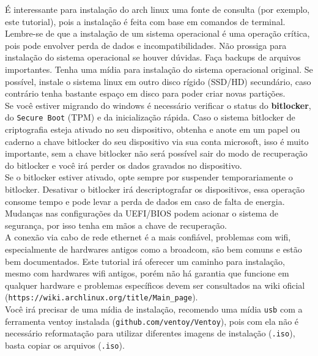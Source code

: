 \documentclass[12pt,a4paper]{article}
\begin{document}
\vspace{\baselineskip}

É interessante para instalação do arch linux uma fonte de consulta (por exemplo, este tutorial), pois a instalação é feita com base em comandos de terminal. Lembre-se de que a instalação de um sistema operacional é uma operação crítica, pois pode envolver perda de dados e incompatibilidades. Não prossiga para instalação do sistema operacional se houver dúvidas. Faça backups de arquivos importantes. Tenha uma mídia para instalação do sistema operacional original. Se possível, instale o sistema linux em outro disco rígido (SSD/HD) secundário, caso contrário tenha bastante espaço em disco para poder criar novas partições. \\

Se você estiver migrando do windows é necessário verificar o status do \textbf{bitlocker}, do \texttt{Secure Boot} (TPM) e da inicialização rápida. Caso o sistema bitlocker de criptografia esteja ativado no seu dispositivo, obtenha e anote em um papel ou caderno a chave bitlocker do seu dispositivo via sua conta microsoft, isso é muito importante, sem a chave bitlocker não será possível sair do modo de recuperação do bitlocker e você irá perder os dados gravados no dispositivo. \\

Se o bitlocker estiver ativado, opte sempre por suspender temporariamente o bitlocker. Desativar o bitlocker irá descriptografar os dispositivos, essa operação consome tempo e pode levar a perda de dados em caso de falta de energia. Mudanças nas configurações da UEFI/BIOS podem acionar o sistema de segurança, por isso tenha em mãos a chave de recuperação. \\

A conexão via cabo de rede ethernet é a mais confiável, problemas com wifi, especialmente de hardwares antigos como a broadcom, são bem comuns e estão bem documentados. Este tutorial irá oferecer um caminho para instalação, mesmo com hardwares wifi antigos, porém não há garantia que funcione em qualquer hardware e problemas específicos devem ser consultados na wiki oficial (\texttt{https://wiki.archlinux.org/title/Main\_page}).\\

Você irá precisar de uma mídia de instalação, recomendo uma mídia \texttt{usb} com a ferramenta ventoy instalada (\texttt{github.com/ventoy/Ventoy}), pois com ela não é necessário reformatação para utilizar diferentes imagens de instalação (\texttt{.iso}), basta copiar os arquivos (\texttt{.iso}). \\
\end{document}
